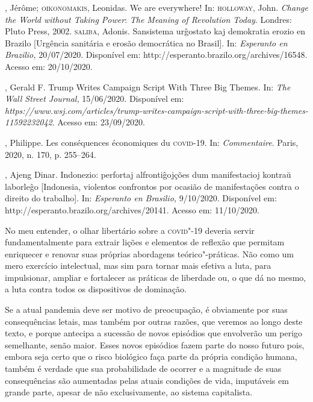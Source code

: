 \begin{bibliohedra}
, Jérôme; \textsc{oikonomakis}, Leonidas. We are everywhere! In: \textsc{holloway},
John. \emph{Change the World without Taking Power}: \emph{The Meaning of
Revolution Today}. Londres: Pluto Press, 2002. \textsc{saliba}, Adonis.
Sansistema urĝostato kaj demokratia erozio en Brazilo {[}Urgência
sanitária e erosão democrática no Brasil{]}. In: \emph{Esperanto en
Brazilio,} 20/07/2020. Disponível em:
http://esperanto.brazilo.org/archives/16548. Acesso em: 20/10/2020.

, Gerald F. Trump Writes Campaign Script With Three Big Themes. In:
\emph{The Wall Street Journal,} 15/06/2020. Disponível em:
\emph{https://www.wsj.com/articles/trump-writes-campaign-script-with-three-big-themes-11592232042}.
Acesso em: 23/09/2020.

, Philippe. Les conséquences économiques du \textsc{covid}-19. In:
\emph{Commentaire}. Paris, 2020, n. 170, p. 255--264.

, Ajeng Dinar. Indonezio: perfortaj alfrontiĝojções dum
manifestacioj kontraŭ laborleĝo {[}Indonesia, violentos confrontos por
ocasião de manifestações contra o direito do trabalho{]}. In:
\emph{Esperanto en Brasilio,} 9/10/2020. Disponível em:
http://esperanto.brazilo.org/archives/20141. Acesso em: 11/10/2020.
\end{bibliohedra}



No meu entender, o olhar libertário sobre a \textsc{covid}"-19 deveria servir
fundamentalmente para extrair lições e elementos de reflexão que
permitam enriquecer e renovar suas próprias abordagens teórico"-práticas.
Não como um mero exercício intelectual, mas sim para tornar mais efetiva
a luta, para impulsionar, ampliar e fortalecer as práticas de liberdade
ou, o que dá no mesmo, a luta contra todos os dispositivos de dominação.

Se a atual pandemia deve ser motivo de preocupação, é obviamente por
suas consequências letais, mas também por outras razões, que veremos ao
longo deste texto, e porque antecipa a sucessão de novos episódios que
envolverão um perigo semelhante, senão maior. Esses novos episódios
fazem parte do nosso futuro pois, embora seja certo que o risco
biológico faça parte da própria condição humana, também é verdade que
sua probabilidade de ocorrer e a magnitude de suas consequências são
aumentadas pelas atuais condições de vida, imputáveis em grande parte,
apesar de não exclusivamente, ao sistema capitalista.

